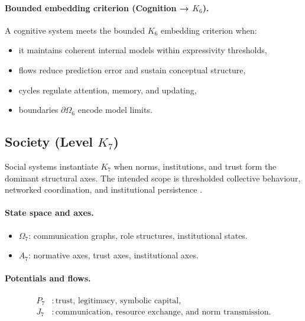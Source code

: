 \paragraph{Bounded embedding criterion (Cognition → \texorpdfstring{\(K_6\)}{K6}).}
A cognitive system meets the bounded \(K_6\) embedding criterion when:
\begin{itemize}
  \item it maintains coherent internal models within expressivity thresholds,
  \item flows reduce prediction error and sustain conceptual structure,
  \item cycles regulate attention, memory, and updating,
  \item boundaries \(\partial\Omega_6\) encode model limits.
\end{itemize}

\subsection{Society (Level \texorpdfstring{$K_7$}{K7})}

Social systems instantiate \(K_7\) when norms, institutions, and trust form the
dominant structural axes.
The intended scope is thresholded collective behaviour, networked coordination,
and institutional persistence \parencite{granovetter_threshold,schelling_micromotives,newman_networks}.

\paragraph{State space and axes.}
\begin{itemize}
  \item \(\Omega_7\): communication graphs, role structures, institutional
        states.
  \item \(A_7\): normative axes, trust axes, institutional axes.
\end{itemize}

\paragraph{Potentials and flows.}
\[
\begin{aligned}
  P_7 &: \text{trust, legitimacy, symbolic capital},\\
  J_7 &: \text{communication, resource exchange, and norm transmission}.
\end{aligned}
\]

